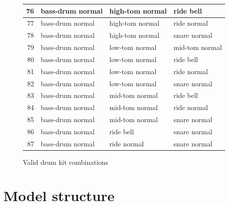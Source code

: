 \begin{appendices}
\begin{figure}[H]
\begin{tiny}
\begin{tabular}{r|l|l|l|}
                    \hline
                    76 & bass-drum normal & high-tom normal & ride bell \\
                    \hline
                    77 & bass-drum normal & high-tom normal & ride normal \\
                    \hline
                    78 & bass-drum normal & high-tom normal & snare normal \\
                    \hline
                    79 & bass-drum normal & low-tom normal & mid-tom normal \\
                    \hline
                    80 & bass-drum normal & low-tom normal & ride bell \\
                    \hline
                    81 & bass-drum normal & low-tom normal & ride normal \\
                    \hline
                    82 & bass-drum normal & low-tom normal & snare normal \\
                    \hline
                    83 & bass-drum normal & mid-tom normal & ride bell \\
                    \hline
                    84 & bass-drum normal & mid-tom normal & ride normal \\
                    \hline
                    85 & bass-drum normal & mid-tom normal & snare normal \\
                    \hline
                    86 & bass-drum normal & ride bell & snare normal \\
                    \hline
                    87 & bass-drum normal & ride normal & snare normal \\
                    \hline
                \end{tabular}
            \end{tiny}
            \caption*{Valid drum kit combinations}
        \end{figure}
    
    \newpage
    \section{Model structure}
    \label{app:model_structure}

\end{appendices}
